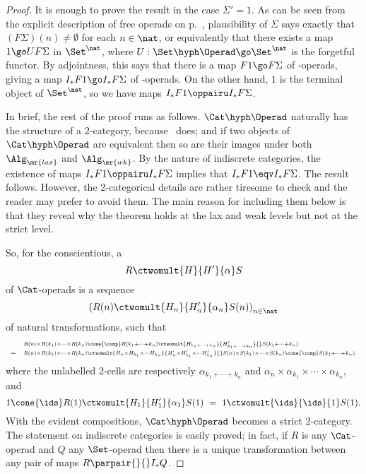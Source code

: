 \begin{proof}
It is enough to prove the result in the case $\Sigma'=1$.  As can be seen
from the explicit description of free operads on
p.~\pageref{p:free-plain-clauses}, plausibility of $\Sigma$ says exactly
that $(F\Sigma)(n)\neq \emptyset$ for each $n\in\nat$, or equivalently that
there exists a map $1\go UF\Sigma$ in $\Set^\nat$, where $U:
\Set\hyph\Operad \go \Set^\nat$ is the forgetful functor.  By adjointness,
this says that there is a map $F1 \go F\Sigma$ of \Set-operads, giving a
map $I_*F1 \go I_*F\Sigma$ of \Cat-operads.  On the other hand, $1$ is the
terminal object of $\Set^\nat$, so we have maps $I_*F1 \oppairu
I_*F\Sigma$.

In brief, the rest of the proof runs as follows.  $\Cat\hyph\Operad$
naturally has the structure of a 2-category, because \Cat\ does; and if two
objects of $\Cat\hyph\Operad$ are equivalent then so are their images under
both $\Alg_\mr{lax}$ and $\Alg_\mr{wk}$.  By the nature of indiscrete
categories, the existence of maps $I_*F1 \oppairu I_*F\Sigma$ implies that
$I_*F1 \eqv I_*F\Sigma$.  The result follows.  However, the 2-categorical
details are rather tiresome to check and the reader may prefer to avoid
them.  The main reason for including them below is that they reveal why the
theorem holds at the lax and weak levels but not at the strict level.

So, for the conscientious, a 
\[
R \ctwomult{H}{H'}{\alpha} S
\]
of $\Cat$-operads is a sequence
\[
\left(
R(n) \ctwomult{H_n}{H'_n}{\alpha_n} S(n)
\right)_{n\in\nat}
\]
of natural transformations, such that
\[
\begin{array}{rl}
&
\scriptstyle
R(n) \times R(k_1) \times\cdots\times R(k_n)
\cone{\comp}
R(k_1 + \cdots + k_n)
\ctwomult{H_{k_1 + \cdots + k_n}}%
{H'_{k_1 + \cdots + k_n}}%
{}
S(k_1 + \cdots + k_n)				\\
=	&
\scriptstyle
R(n) \times R(k_1) \times\cdots\times R(k_n)
\ctwomult{H_n \times H_{k_1} \times\cdots H_{k_n}}%
{H'_n \times H'_{k_1} \times\cdots H'_{k_n}}%
{}
S(n) \times S(k_1) \times\cdots\times S(k_n)
\cone{\comp}
S(k_1 + \cdots + k_n),
\end{array}
\]
where the unlabelled 2-cells are respectively $\alpha_{k_1 + \cdots + k_n}$
and $\alpha_n \times \alpha_{k_1} \times\cdots\times \alpha_{k_n}$, and
\[
1 \cone{\ids} R(1) \ctwomult{H_1}{H'_1}{\alpha_1} S(1)
\ =\ 
1 \ctwomult{\ids}{\ids}{1} S(1).
\]
With the evident compositions, $\Cat\hyph\Operad$%
% 
% 
becomes a strict
2-category.  The statement on indiscrete categories is easily proved; in
fact, if $R$ is any $\Cat$-operad and $Q$ any $\Set$-operad then there is a
unique transformation between any pair of maps $R \parpair{}{} I_*Q$.


\end{proof}
